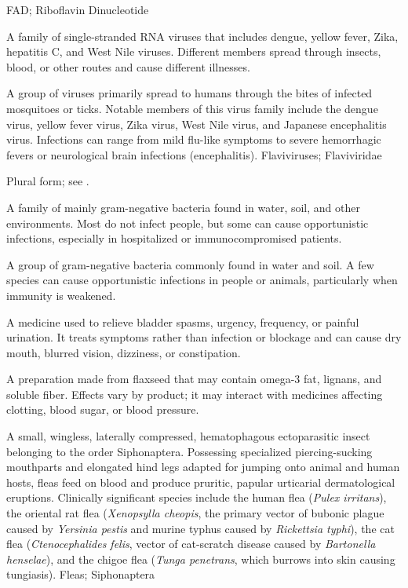 \synonyms
FAD; Riboflavin Dinucleotide

 A family of single-stranded RNA viruses that includes dengue, yellow fever, Zika, hepatitis C, and West Nile viruses. Different members spread through insects, blood, or other routes and cause different illnesses.

 A group of viruses primarily spread to humans through the bites of infected mosquitoes or ticks. Notable members of this virus family include the dengue virus, yellow fever virus, Zika virus, West Nile virus, and Japanese encephalitis virus. Infections can range from mild flu-like symptoms to severe hemorrhagic fevers or neurological brain infections (encephalitis).
\synonyms
Flaviviruses; Flaviviridae

 Plural form; see .

 A family of mainly gram-negative bacteria found in water, soil, and other environments. Most do not infect people, but some can cause opportunistic infections, especially in hospitalized or immunocompromised patients.

 A group of gram-negative bacteria commonly found in water and soil. A few species can cause opportunistic infections in people or animals, particularly when immunity is weakened.

 A medicine used to relieve bladder spasms, urgency, frequency, or painful urination. It treats symptoms rather than infection or blockage and can cause dry mouth, blurred vision, dizziness, or constipation.

 A preparation made from flaxseed that may contain omega-3 fat, lignans, and soluble fiber. Effects vary by product; it may interact with medicines affecting clotting, blood sugar, or blood pressure.

 A small, wingless, laterally compressed, hematophagous ectoparasitic insect belonging to the order Siphonaptera. Possessing specialized piercing-sucking mouthparts and elongated hind legs adapted for jumping onto animal and human hosts, fleas feed on blood and produce pruritic, papular urticarial dermatological eruptions. Clinically significant species include the human flea (\textit{Pulex irritans}), the oriental rat flea (\textit{Xenopsylla cheopis}, the primary vector of bubonic plague caused by \textit{Yersinia pestis} and murine typhus caused by \textit{Rickettsia typhi}), the cat flea (\textit{Ctenocephalides felis}, vector of cat-scratch disease caused by \textit{Bartonella henselae}), and the chigoe flea (\textit{Tunga penetrans}, which burrows into skin causing tungiasis).
\synonyms
Fleas; Siphonaptera


